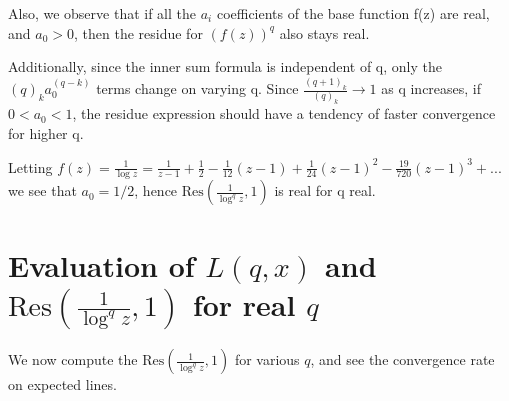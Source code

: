 \documentclass[a4paper,11pt,twoside]{amsart}
\newcommand\Res{\mathrm{Res}}
\begin{document}
Also, we observe that if all the $a_i$ coefficients of the base function f(z) are real, and $a_0 > 0$, then the residue for $(f(z))^q$ also stays real. 

Additionally, since the inner sum formula is independent of q, only the $(q)_k a_{0}^{(q-k)}$ terms change on varying q. Since $\frac{(q+1)_k}{(q)_k} \to 1$ as q increases, if $0 < a_0 < 1$, the residue expression should have a tendency of faster convergence for higher q. 

Letting $f(z) = \frac{1}{\log z} = \frac{1}{z-1} + \frac{1}{2} - \frac{1}{12} (z-1) + \frac{1}{24}(z-1)^2 - \frac{19}{720}(z-1)^3 + ...$ we see that $a_0 = 1/2$, hence $\Res(\frac{1}{\log^{q} z},1)$ is real for q real.

\section{Evaluation of $L(q,x)$ and $\Res\left(\frac{1}{\log^{q} z},1\right)$ for real $q$}

We now compute the $\Res\left(\frac{1}{\log^{q} z},1\right)$ for various $q$, and see the convergence rate on expected lines.
\end{document}
